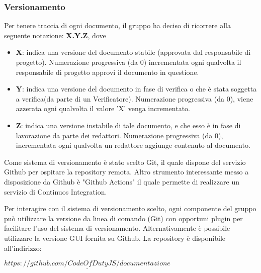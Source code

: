 		\subsubsection{Versionamento}
			
			Per tenere traccia di ogni documento, il gruppo ha deciso di ricorrere alla seguente notazione: \textbf{X.Y.Z}, dove
			\begin{itemize}
				
				\item \textbf{X}: indica una versione del documento stabile (approvata dal responsabile di progetto). Numerazione progressiva (da 0) incrementata ogni qualvolta il responsabile di progetto approvi il documento in questione.
				
				\item \textbf{Y}: indica una versione del documento in fase di verifica o che è stata soggetta a verifica(da parte di un Verificatore). Numerazione progressiva (da 0), viene azzerata ogni qualvolta il valore 'X' venga incrementato.
				
				\item \textbf{Z}: indica una versione instabile di tale documento, e che esso è in fase di lavorazione da parte dei redattori. Numerazione progressiva (da 0), incrementata ogni qualvolta un redattore aggiunge contenuto al documento.
			\end{itemize}
			
			Come sistema di versionamento è stato scelto Git, il quale dispone del servizio Github per ospitare la repository remota. Altro strumento interessante messo a disposizione da Github è "Github Actions" il quale permette di realizzare un servizio di Continuos Integration.
			
			Per interagire con il sistema di versionamento scelto, ogni componente del gruppo può utilizzare la versione da linea di comando (Git) con opportuni plugin per facilitare l'uso del sistema di versionamento. Alternativamente è possibile utilizzare la versione GUI fornita su Github. La repository è disponibile all'indirizzo:\\
			\begin{center}
				$\underline{https://github.com/CodeOfDutyJS/documentazione}$
			\end{center}
			
